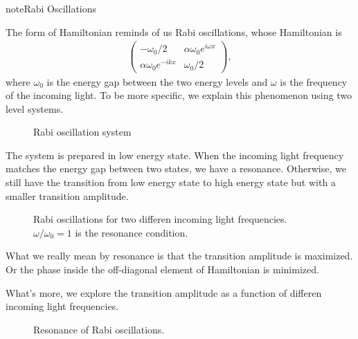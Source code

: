 \documentclass[letterpaper,12pt,english]{sphinxmanual}
\begin{document}
\begin{sphinxadmonition}{note}{Rabi Oscillations}

The form of Hamiltonian reminds of us Rabi oscillations, whose Hamiltonian is
\begin{equation*}
\begin{split}\begin{pmatrix}
-\omega_0/2 & \alpha \omega_0 e^{i \omega x}\\
\alpha \omega_0  e^{-i k x} & \omega_0/2
\end{pmatrix},\end{split}
\end{equation*}
where \(\omega_0\) is the energy gap between the two energy levels and \(\omega\) is the frequency of the incoming light. To be more specific, we explain this phenomenon using two level systems.
\begin{figure}[htbp]
\centering
\capstart

\noindent{}
\caption{Rabi oscillation system}\label{\detokenize{matter-stimulated/single-frequency:id2}}\end{figure}

The system is prepared in low energy state. When the incoming light frequency matches the energy gap between two states, we have a resonance. Otherwise, we still have the transition from low energy state to high energy state but with a smaller transition amplitude.
\begin{figure}[htbp]
\centering
\capstart

\noindent{}
\caption{Rabi oscillations for two differen incoming light frequencies. \(\omega/\omega_0 =1\) is the resonance condition.}\label{\detokenize{matter-stimulated/single-frequency:id3}}\end{figure}

What we really mean by resonance is that the transition amplitude is maximized. Or the phase inside the off-diagonal element of Hamiltonian is minimized.

What's more, we explore the transition amplitude as a function of differen incoming light frequencies.
\begin{figure}[htbp]
\centering
\capstart

\noindent{}
\caption{Resonance of Rabi oscillations.}\label{\detokenize{matter-stimulated/single-frequency:id4}}\end{figure}
\end{sphinxadmonition}
\end{document}
